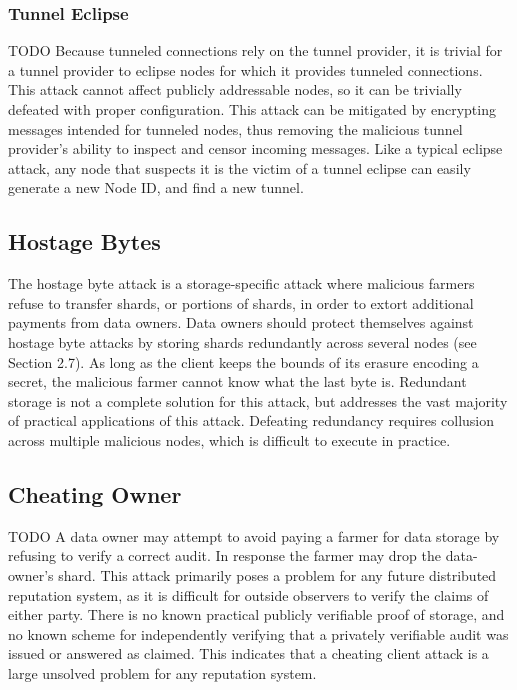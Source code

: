 \documentclass[a4paper,10pt]{article} \usepackage[utf8]{inputenc}
\newcommand{\todo}[1]{{\color{red} TODO #1}}
\begin{document}
\subsubsection{Tunnel Eclipse}

\todo{ Because tunneled connections rely on the tunnel provider, it is trivial
for a tunnel provider to eclipse nodes for which it provides tunneled
connections. This attack cannot affect publicly addressable nodes, so it can be
trivially defeated with proper configuration. This attack can be mitigated by
encrypting messages intended for tunneled nodes, thus removing the malicious
tunnel provider's ability to inspect and censor incoming messages. Like a
typical eclipse attack, any node that suspects it is the victim of a tunnel
eclipse can easily generate a new Node ID, and find a new tunnel. }

\subsection{Hostage Bytes}

The hostage byte attack is a storage-specific attack where malicious farmers
refuse to transfer shards, or portions of shards, in order to extort additional
payments from data owners. Data owners should protect themselves against hostage
byte attacks by storing shards redundantly across several nodes (see Section
2.7). As long as the client keeps the bounds of its erasure encoding a secret,
the malicious farmer cannot know what the last byte is. Redundant storage is not
a complete solution for this attack, but addresses the vast majority of
practical applications of this attack. Defeating redundancy requires collusion
across multiple malicious nodes, which is difficult to execute in practice.

\subsection{Cheating Owner}

\todo{ A data owner may attempt to avoid paying a farmer for data storage by
refusing to verify a correct audit. In response the farmer may drop the
data-owner’s shard. This attack primarily poses a problem for any future
distributed reputation system, as it is difficult for outside observers to
verify the claims of either party. There is no known practical publicly
verifiable proof of storage, and no known scheme for independently verifying
that a privately verifiable audit was issued or answered as claimed. This
indicates that a cheating client attack is a large unsolved problem for any
reputation system. }
\end{document}
